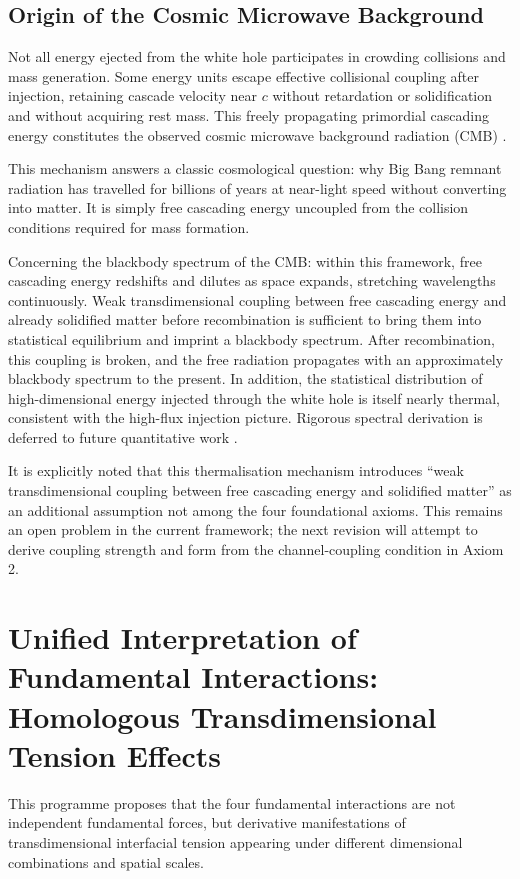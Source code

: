 \documentclass[12pt,a4paper]{article}
\begin{document}
\subsection{Origin of the Cosmic Microwave Background}
Not all energy ejected from the white hole participates in crowding collisions and mass generation. Some energy units escape effective collisional coupling after injection, retaining cascade velocity near $c$ without retardation or solidification and without acquiring rest mass. This freely propagating primordial cascading energy constitutes the observed cosmic microwave background radiation (CMB) \cite{penzias1965, smoot1992}.

This mechanism answers a classic cosmological question: why Big Bang remnant radiation has travelled for billions of years at near-light speed without converting into matter. It is simply free cascading energy uncoupled from the collision conditions required for mass formation.

Concerning the blackbody spectrum of the CMB: within this framework, free cascading energy redshifts and dilutes as space expands, stretching wavelengths continuously. Weak transdimensional coupling between free cascading energy and already solidified matter before recombination is sufficient to bring them into statistical equilibrium and imprint a blackbody spectrum. After recombination, this coupling is broken, and the free radiation propagates with an approximately blackbody spectrum to the present. In addition, the statistical distribution of high-dimensional energy injected through the white hole is itself nearly thermal, consistent with the high-flux injection picture. Rigorous spectral derivation is deferred to future quantitative work \cite{planck2018, komatsu2011}.

It is explicitly noted that this thermalisation mechanism introduces “weak transdimensional coupling between free cascading energy and solidified matter” as an additional assumption not among the four foundational axioms. This remains an open problem in the current framework; the next revision will attempt to derive coupling strength and form from the channel-coupling condition in Axiom 2.

\section{Unified Interpretation of Fundamental Interactions: Homologous Transdimensional Tension Effects}
This programme proposes that the four fundamental interactions are not independent fundamental forces, but derivative manifestations of transdimensional interfacial tension appearing under different dimensional combinations and spatial scales.
\end{document}
